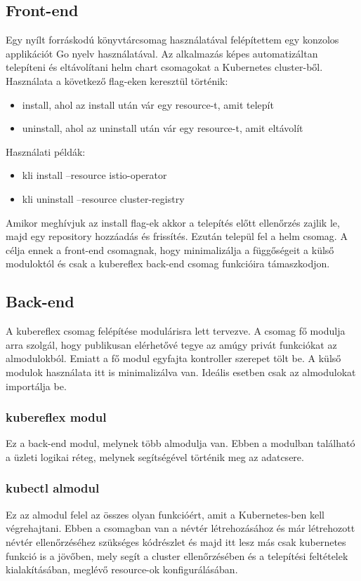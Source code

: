 \subsection{Front-end}
Egy nyílt forráskodú könyvtárcsomag használatával felépítettem egy konzolos applikációt Go nyelv használatával. Az alkalmazás képes automatizáltan telepíteni és eltávolítani helm chart csomagokat a Kubernetes cluster-ből. Használata a következő flag-eken keresztül történik:
\begin{itemize}
    \item install, ahol az install után vár egy resource-t, amit telepít
    \item uninstall, ahol az uninstall után vár egy resource-t, amit eltávolít
\end{itemize}
Használati példák:
\begin{itemize}
    \item kli install --resource istio-operator
    \item kli uninstall --resource cluster-registry
\end{itemize}
Amikor meghívjuk az install flag-ek akkor a telepítés előtt ellenőrzés zajlik le, majd egy repository hozzáadás és frissítés. Ezután települ fel a helm csomag. A célja ennek a front-end csomagnak, hogy minimalizálja a függőségeit a külső moduloktól és csak a kubereflex back-end csomag funkcióira támaszkodjon.
\subsection{Back-end}
A kubereflex csomag felépítése modulárisra lett tervezve. A csomag fő modulja arra szolgál, hogy publikusan elérhetővé tegye az amúgy privát funkciókat az almodulokból. Emiatt a fő modul egyfajta kontroller szerepet tölt be. A külső modulok használata itt is minimalizálva van. Ideális esetben csak az almodulokat importálja be.
\subsubsection*{kubereflex modul}
Ez a back-end modul, melynek több almodulja van. Ebben a modulban található a üzleti logikai réteg, melynek segítségével történik meg az adatcsere.
\subsubsection*{kubectl almodul}
Ez az almodul felel az összes olyan funkcióért, amit a Kubernetes-ben kell végrehajtani. Ebben a csomagban van a névtér létrehozásához és már létrehozott névtér ellenőrzéséhez szükséges kódrészlet és majd itt lesz más csak kubernetes funkció is a jövőben, mely segít a cluster ellenőrzésében és a telepítési feltételek kialakításában, meglévő resource-ok konfigurálásában.
